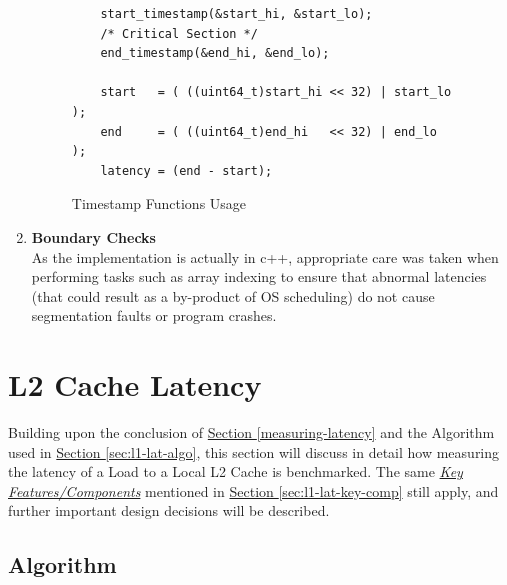 \documentclass[bsc,frontabs,twoside,singlespacing,parskip,deptreport]{infthesis}     %
\begin{document}
\begin{enumerate}
{\begin{figure}[h!]
\begin{verbatim}
    start_timestamp(&start_hi, &start_lo);
    /* Critical Section */
    end_timestamp(&end_hi, &end_lo);  
    
    start   = ( ((uint64_t)start_hi << 32) | start_lo );
    end     = ( ((uint64_t)end_hi   << 32) | end_lo   );
    latency = (end - start);
        \end{verbatim}
        \caption{Timestamp Functions Usage}
        \label{fig:timestamp_usage_l1}
    \end{figure}
    
    }
    \item{{\bf Boundary Checks} \\
    As the implementation is actually in c++, appropriate care was taken when performing tasks such as array indexing to ensure that abnormal latencies (that could result as a by-product of OS scheduling) do not cause segmentation faults or program crashes. }
\end{enumerate}



\newpage

\section{L2 Cache Latency}\label{sec:l2-cache-latency}
Building upon the conclusion of \hyperref[measuring-latency]{Section \ref{measuring-latency}} and the Algorithm used in \hyperref[measuring-latency]{Section \ref{sec:l1-lat-algo}}, this section will discuss in detail how measuring the latency of a Load to a Local L2 Cache is benchmarked. The same \hyperref[sec:l1-lat-key-comp]{\emph{Key Features/Components}} mentioned in \hyperref[measuring-latency]{Section \ref{sec:l1-lat-key-comp}} still apply, and further important design decisions will be described.

\subsection{Algorithm}\label{sec:l2-lat-algo}
\end{document}
